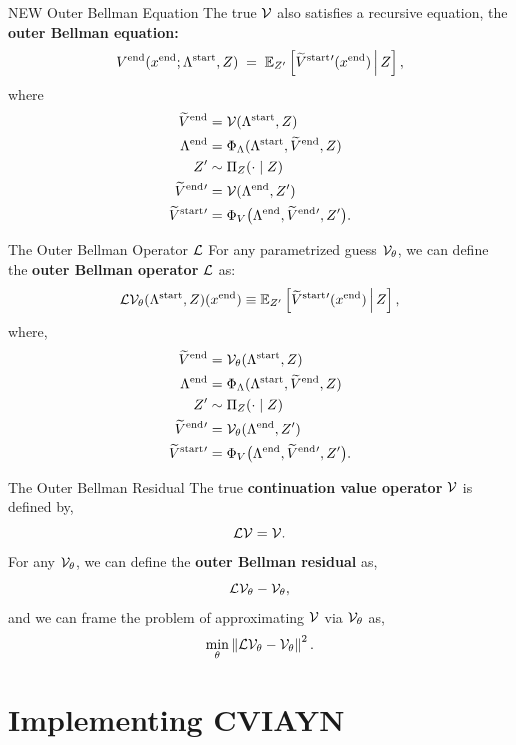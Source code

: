 \documentclass[10pt,aspectratio=169]{beamer}
\begin{document}
\begin{frame}{NEW Outer Bellman Equation}
  The true $\mathcal{V}$ also satisfies a recursive equation, the \textbf{outer Bellman equation:}
  \[
    V^{\mathrm{end}}(x^{\mathrm{end}}; \Lambda^{\mathrm{start}}, Z) \;=\; \mathbb{E}_{Z'}\left[ \widetilde{V}^{\mathrm{start}}{}'(x^{\mathrm{end}})\,\Big|\, Z \right],
  \]
  where
  \begin{align*}
    \widetilde{V}^{\mathrm{end}} &= \mathcal{V}(\Lambda^{\mathrm{start}}, Z) \\
    \Lambda^{\mathrm{end}} &= \Phi_\Lambda(\Lambda^{\mathrm{start}}, \widetilde{V}^{\mathrm{end}}, Z) \\
    Z' &\sim \Pi_Z(\cdot \mid Z) \\
    \widetilde{V}^{\mathrm{end}}{}' &= \mathcal{V}(\Lambda^{\mathrm{end}}, Z') \\
    \widetilde{V}^{\mathrm{start}}{}'  &= \Phi_V\bigl(\Lambda^{\mathrm{end}}, \widetilde{V}^{\mathrm{end}}{}', Z'\bigr).
  \end{align*}
\end{frame}

\begin{frame}{The Outer Bellman Operator $\mathcal{L}$}
  For any parametrized guess $\mathcal{V}_\theta$, we can define the \textbf{outer Bellman operator} $\mathcal{L}$ as:
  \[
    \mathcal{L}\mathcal{V}_\theta(\Lambda^{\mathrm{start}}, Z)(x^{\mathrm{end}}) \equiv \mathbb{E}_{Z'}\left[ \widetilde{V}^{\mathrm{start}}{}'(x^{\mathrm{end}})\,\Big|\, Z \right],
  \]
  where,
  \begin{align*}
    \widetilde{V}^{\mathrm{end}} &= \mathcal{V}_\theta(\Lambda^{\mathrm{start}}, Z) \\
    \Lambda^{\mathrm{end}} &= \Phi_\Lambda(\Lambda^{\mathrm{start}}, \widetilde{V}^{\mathrm{end}}, Z) \\
    Z' &\sim \Pi_Z(\cdot \mid Z) \\
    \widetilde{V}^{\mathrm{end}}{}' &= \mathcal{V}_\theta(\Lambda^{\mathrm{end}}, Z') \\
    \widetilde{V}^{\mathrm{start}}{}'  &= \Phi_V\bigl(\Lambda^{\mathrm{end}}, \widetilde{V}^{\mathrm{end}}{}', Z'\bigr).
  \end{align*}
\end{frame}

\begin{frame}{The Outer Bellman Residual}
  The true \textbf{continuation value operator} $\mathcal{V}$ is defined by,
  \[
    \mathcal{L}\mathcal{V} = \mathcal{V}.
  \]
  For any $\mathcal{V}_\theta$, we can define the \textbf{outer Bellman residual} as,
  \[
    \mathcal{L}\mathcal{V}_\theta - \mathcal{V}_\theta,
  \]
  and we can frame the problem of approximating $\mathcal{V}$ via $\mathcal{V}_\theta$ as,
  \[
    \min_\theta \left\| \mathcal{L}\mathcal{V}_\theta - \mathcal{V}_\theta \right\|^2.
  \]
\end{frame}

\section[Implementing CVIAYN]{Implementing CVIAYN}
\end{document}
